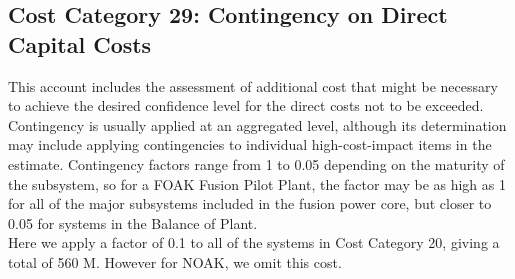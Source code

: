 \subsection{Cost Category 29: Contingency on Direct Capital Costs}

This account includes the assessment of additional cost that might be necessary to achieve the desired confidence level for the direct costs not to be exceeded. Contingency is usually applied at an aggregated level, although its determination may include applying contingencies to individual high-cost-impact items in the estimate.  Contingency factors range from 1 to 0.05 depending on the maturity of the subsystem, so for a FOAK Fusion Pilot Plant, the factor may be as high as 1 for all of the major subsystems included in the fusion power core, but closer to 0.05 for systems in the Balance of Plant.  \\

Here we apply a factor of 0.1 to all of the systems in Cost Category 20, giving a total of  560 M. {\color{blue} However for NOAK, we omit this cost.}

